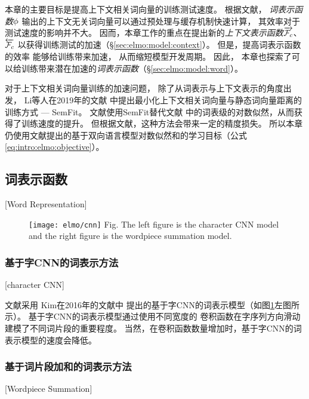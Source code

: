 本章的主要目标是提高上下文相关词向量的训练测试速度。
根据文献，
\textit{词表示函数}$\phi$
输出的上下文无关词向量可以通过预处理与缓存机制快速计算，
其效率对于测试速度的影响并不大。
因而，本章工作的重点在提出新的\textit{上下文表示函数}$\overrightarrow{\mathcal{F}_{c}}$、$\overleftarrow{\mathcal{F}_{c}}$
以获得训练测试的加速（\S\ref{sec:elmo:model:context}）。
但是，提高词表示函数的效率
能够给训练带来加速，
从而缩短模型开发周期。
因此，
本章也探索了可以给训练带来潜在加速的\textit{词表示函数}（\S\ref{sec:elmo:model:word}）。

对于上下文相关词向量训练的加速问题，
除了从词表示与上下文表示的角度出发，
Li等人在2019年的文献
中提出最小化上下文相关词向量与静态词向量距离的训练方式 --- SemFit。
文献使用SemFit替代文献
中的词表级的对数似然，从而获得了训练速度的提升。
但根据文献，这种方法会带来一定的精度损失。
所以本章仍使用文献提出的基于双向语言模型对数似然和的学习目标（公式\ref{eq:intro:elmo:objective}）。

\subsection{词表示函数}[Word Representation]\label{sec:elmo:model:word}
\begin{figure}[t]
	\centering
	\texttt{[image: elmo/cnn]}
	{Fig. $\!$}{The left figure is the character CNN model
		and the right figure is the wordpiece summation model.\label{fig:elmo:word-repr}
	}
\end{figure}

\subsubsection{基于字CNN的词表示方法}[character CNN]\label{sec:elmo:model:word:char}

文献采用
Kim在2016年的文献中
提出的基于字CNN的词表示模型（如图\ref{fig:elmo:word-repr}左图所示）。
基于字CNN的词表示模型通过使用不同宽度的
卷积函数在字序列方向滑动建模了不同词片段的重要程度。
当然，在卷积函数数量增加时，基于字CNN的词表示模型的速度会降低。

\subsubsection{基于词片段加和的词表示方法}[Wordpiece Summation]\label{sec:elmo:model:word:wp}

